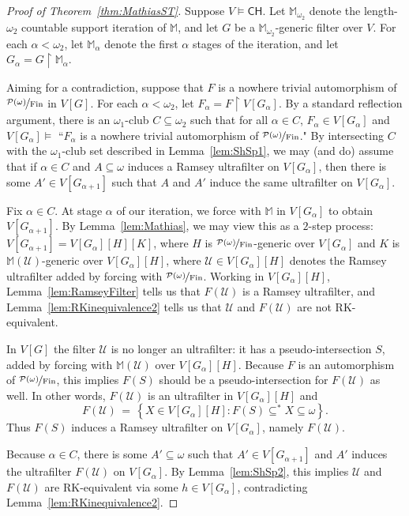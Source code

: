 \documentclass[11pt,leqno]{amsart}
\theoremstyle{definition}
\theoremstyle{remark}
\newcommand{\U}{\mathcal{U}}
\newcommand{\explicitSet}[1]{\left\lbrace #1 \right\rbrace}
\newcommand{\set}[2]{\explicitSet{#1 \colon #2}}
\newcommand{\<}{\langle}
\renewcommand{\>}{\rangle}
\renewcommand{\a}{\alpha}
\newcommand{\w}{\omega}
\newcommand{\0}{\emptyset}
\newcommand{\sub}{\subseteq}
\newcommand{\1}{1\hspace{-1.75mm}1}
\newcommand{\pwmf}{\nicefrac{\mathcal{P}(\w)}{\mathrm{Fin}}}
\newcommand{\ch}{\ensuremath{\mathsf{CH}}\xspace}
\newcommand{\M}{\mathbb{M}}
\begin{document}
\begin{proof}[Proof of Theorem~\ref{thm:MathiasST}]
Suppose $V \models \ch$. 
Let $\M_{\w_2}$ denote the length-$\w_2$ countable support iteration of $\M$, and let $G$ be a $\M_{\w_2}$-generic filter over $V$. 
For each $\a < \w_2$, let $\M_\a$ denote the first $\a$ stages of the iteration, and let $G_\a = G \restriction \M_\a$. 

Aiming for a contradiction, suppose that $F$ is a nowhere trivial automorphism of $\pwmf$ in $V[G]$. For each $\a < \w_2$, let $F_\a = F \restriction V[G_\a]$. 
By a standard reflection argument, there is an $\w_1$-club $C \sub \w_2$ such that for all $\a \in C$, $F_\a \in V[G_\a]$ and $V[G_\a] \models$ ``$F_\a$ is a nowhere trivial automorphism of $\pwmf$." 
By intersecting $C$ with the $\w_1$-club set described in Lemma~\ref{lem:ShSp1}, we may (and do) assume that if $\a \in C$ and 
$A \sub \w$ induces a Ramsey ultrafilter on $V[G_\a]$, then there is some $A' \in V[G_{\a+1}]$ such that $A$ and $A'$ induce the same ultrafilter on $V[G_\a]$.

Fix $\a \in C$. 
At stage $\a$ of our iteration, we force with $\M$ in $V[G_\a]$ to obtain $V[G_{\a+1}]$. 
By Lemma~\ref{lem:Mathias}, we may view this as a $2$-step process: $V[G_{\a+1}] = V[G_\a][H][K]$, where $H$ is $\pwmf$-generic over $V[G_\a]$ and $K$ is $\M(\U)$-generic over $V[G_\a][H]$, where $\U \in V[G_\a][H]$ denotes the Ramsey ultrafilter added by forcing with $\pwmf$. 
Working in $V[G_\a][H]$, Lemma~\ref{lem:RamseyFilter} tells us that $F(\U)$ is a Ramsey ultrafilter, and 
Lemma~\ref{lem:RKinequivalence2} tells us that $\U$ and $F(\U)$ are not RK-equivalent. 

In $V[G]$ the filter $\U$ is no longer an ultrafilter: it has a pseudo-intersection $S$, added by forcing with $\M(\U)$ over $V[G_\a][H]$. Because $F$ is an automorphism of $\pwmf$, this implies $F(S)$ should be a pseudo-intersection for $F(\U)$ as well. 
In other words, $F(\U)$ is an ultrafilter in $V[G_\a][H]$ and 
$$F(\U) \,=\, \set{X \in V[G_\a][H]}{F(S) \sub^* X \sub \w}.$$ 
Thus $F(S)$ induces a Ramsey ultrafilter on $V[G_\a]$, namely $F(\U)$. 

Because $\a \in C$, there is some $A' \sub \w$ such that $A' \in V[G_{\a+1}]$ and $A'$ induces the ultrafilter $F(\U)$ on $V[G_\a]$. 
By Lemma~\ref{lem:ShSp2}, this implies $\U$ and $F(\U)$ are RK-equivalent via some $h \in V[G_\a]$, contradicting  Lemma~\ref{lem:RKinequivalence2}. 
\end{proof}
\end{document}

